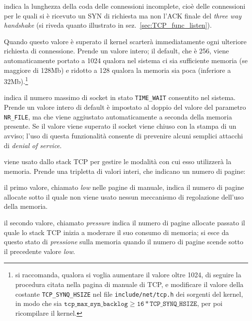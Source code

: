 \begin{basedescript}{\desclabelwidth{2.2cm}\desclabelstyle{\nextlinelabel}}

\item[\sysctlrelfiled{net/ipv4}{tcp\_max\_syn\_backlog}] indica la lunghezza
  della coda delle connessioni incomplete, cioè delle connessioni per le quali
  si è ricevuto un SYN di richiesta ma non l'ACK finale del \textit{three way
    handshake} (si riveda quanto illustrato in
  sez.~\ref{sec:TCP_func_listen}).

  Quando questo valore è superato il kernel scarterà immediatamente ogni
  ulteriore richiesta di connessione. Prende un valore intero; il default, che
  è 256, viene automaticamente portato a 1024 qualora nel sistema ci sia
  sufficiente memoria (se maggiore di 128Mb) e ridotto a 128 qualora la
  memoria sia poca (inferiore a 32Mb).\footnote{si raccomanda, qualora si
    voglia aumentare il valore oltre 1024, di seguire la procedura citata
    nella pagina di manuale di TCP, e modificare il valore della costante
    \texttt{TCP\_SYNQ\_HSIZE} nel file \texttt{include/net/tcp.h} dei sorgenti
    del kernel, in modo che sia $\mathtt{tcp\_max\_syn\_backlog} \ge
    \mathtt{16*TCP\_SYNQ\_HSIZE}$, per poi ricompilare il kernel.}

\item[\sysctlrelfiled{net/ipv4}{tcp\_max\_tw\_buckets}] indica il
  numero massimo di socket in stato \texttt{TIME\_WAIT} consentito nel
  sistema. Prende un valore intero di default è impostato al doppio del valore
  del parametro \texttt{NR\_FILE}, ma che viene aggiustato automaticamente a
  seconda della memoria presente. Se il valore viene superato il socket viene
  chiuso con la stampa di un avviso; l'uso di questa funzionalità consente di
  prevenire alcuni semplici attacchi di \textit{denial of service}.
  

\item[\sysctlrelfiled{net/ipv4}{tcp\_mem}] viene usato dallo stack TCP
  per gestire le modalità con cui esso utilizzerà la memoria. Prende una
  tripletta di valori interi, che indicano un numero di pagine:

  \begin{itemize*}
  \item il primo valore, chiamato \textit{low} nelle pagine di manuale, indica
    il numero di pagine allocate sotto il quale non viene usato nessun
    meccanismo di regolazione dell'uso della memoria.

  \item il secondo valore, chiamato \textit{pressure} indica il numero di
    pagine allocate passato il quale lo stack TCP inizia a moderare il suo
    consumo di memoria; si esce da questo stato di \textsl{pressione} sulla
    memoria quando il numero di pagine scende sotto il precedente valore
    \textit{low}.


\end{itemize*}
\end{basedescript}
